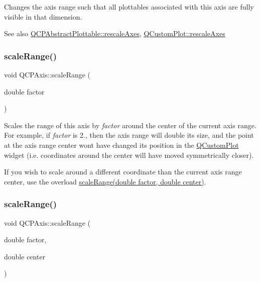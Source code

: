Changes the axis range such that all plottables associated with this axis are fully visible in that dimension.

\begin{DoxySeeAlso}{See also}
\hyperlink{class_q_c_p_abstract_plottable_a1491c4a606bccd2d09e65e11b79eb882}{Q\+C\+P\+Abstract\+Plottable\+::rescale\+Axes}, \hyperlink{class_q_custom_plot_ad86528f2cee6c7e446dea4a6e8839935}{Q\+Custom\+Plot\+::rescale\+Axes} 
\end{DoxySeeAlso}
\mbox{\label{class_q_c_p_axis_a31d18ddf3a4f21ceb077db8ae5b69856}} 
\subsubsection{\texorpdfstring{scale\+Range()}{scaleRange()}\hspace{0.1cm}{\footnotesize\ttfamily [1/2]}}
{\footnotesize\ttfamily void Q\+C\+P\+Axis\+::scale\+Range (\begin{DoxyParamCaption}\item[{double}]{factor }\end{DoxyParamCaption})}

Scales the range of this axis by {\itshape factor} around the center of the current axis range. For example, if {\itshape factor} is 2., then the axis range will double its size, and the point at the axis range center won\textquotesingle{}t have changed its position in the \hyperlink{class_q_custom_plot}{Q\+Custom\+Plot} widget (i.\+e. coordinates around the center will have moved symmetrically closer).

If you wish to scale around a different coordinate than the current axis range center, use the overload \hyperlink{class_q_c_p_axis_a7072ff96fe690148f1bbcdb4f773ea1c}{scale\+Range(double factor, double center)}. \mbox{\label{class_q_c_p_axis_a7072ff96fe690148f1bbcdb4f773ea1c}} 
\subsubsection{\texorpdfstring{scale\+Range()}{scaleRange()}\hspace{0.1cm}{\footnotesize\ttfamily [2/2]}}
{\footnotesize\ttfamily void Q\+C\+P\+Axis\+::scale\+Range (\begin{DoxyParamCaption}\item[{double}]{factor,  }\item[{double}]{center }\end{DoxyParamCaption})}


